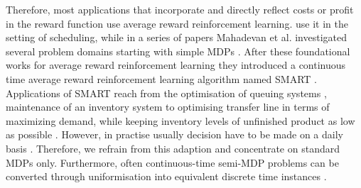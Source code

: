 \documentclass[envcountsame]{llncs}
\begin{document}
Therefore, most applications that incorporate and directly reflect costs or profit in the reward
function use average reward reinforcement learning. \citet{aydin2000dynamic} use it in the setting
of scheduling, while in a series of papers Mahadevan et al. investigated several problem domains
starting with simple MDPs
\citep{Mahadevan96_AverageRewardReinforcementLearningFoundationsAlgorithmsAndEmpiricalResults,Mahadevan96_OptimalityCriteriaInReinforcementLearning}.
After these foundational works for average reward reinforcement learning they introduced a
continuous time average reward reinforcement learning algorithm named SMART
\citep{Mahadevan97_SelfimprovingFactorySimulationUsingContinuoustimeAveragerewardReinforcementLearning}.
Applications of SMART reach from the optimisation of queuing systems
\citep{Mahadevan96_AnAveragerewardReinforcementLearningAlgorithmForComputingBiasoptimalPolicies,Mahadevan96_SensitiveDiscountOptimalityUnifyingDiscountedAndAverageRewardReinforcementLearning},
maintenance of an inventory system
\citep{Das99_SolvingSemiMarkovDecisionProblemsUsingAverageRewardReinforcementLearning} to optimising
transfer line in terms of maximizing demand, while keeping inventory levels of unfinished product as
low as possible \citep{Mahadevan98_OptimizingProductionManufacturingUsingReinforcementLearning}.
However, in practise usually decision have to be made on a daily basis \citep{enns2004work}.
Therefore, we refrain from this adaption and concentrate on standard MDPs only. Furthermore, often
continuous-time semi-MDP problems can be converted through uniformisation into equivalent discrete
time instances \citep[see][]{Puterman94,bertsekas1995dynamic}.
\end{document}
